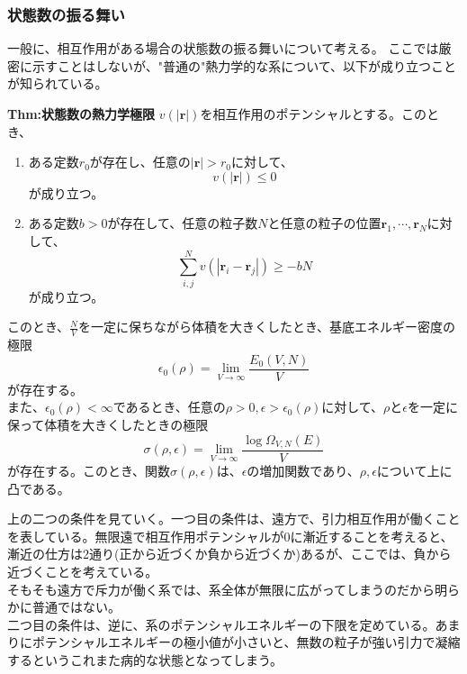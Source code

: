 \documentclass[a4paper,11pt]{jsarticle}
\numberwithin{equation}{section}
\begin{document}
\subsubsection{状態数の振る舞い}
一般に、相互作用がある場合の状態数の振る舞いについて考える。
ここでは厳密に示すことはしないが、"普通の"熱力学的な系について、以下が成り立つことが知られている。\\
\begin{itembox}[l]{\textbf{Thm:状態数の熱力学極限}}
  $v(|\bm{r}|)$を相互作用のポテンシャルとする。このとき、
  \begin{enumerate}
    \item ある定数$r_0$が存在し、任意の$|\bm{r}|>r_0$に対して、
    \begin{equation}
    v(|\bm{r}|) \leq 0
    \end{equation}
    が成り立つ。
    \item ある定数$b>0$が存在して、任意の粒子数$N$と任意の粒子の位置$\bm{r}_1, \cdots , \bm{r}_N$に対して、
    \begin{equation}
    \sum_{i,j}^{N} v(|\bm{r}_i - \bm{r}_j|) \geq -bN
    \end{equation}
    が成り立つ。
  \end{enumerate}
  このとき、$\frac{N}{V}$を一定に保ちながら体積を大きくしたとき、基底エネルギー密度の極限
  \begin{equation}
    \epsilon_0(\rho) = \lim_{V \rightarrow \infty} \frac{E_0(V,N)}{V}
  \end{equation}
  が存在する。\\
  また、$\epsilon_0(\rho)<\infty$であるとき、任意の$\rho >0, \epsilon > \epsilon_0(\rho)$に対して、$\rho$と$\epsilon$を一定に保って体積を大きくしたときの極限
  \begin{equation}
    \sigma (\rho, \epsilon) = \lim_{V \rightarrow \infty} \frac{\log \Omega_{V,N}(E)}{V}
  \end{equation}
  が存在する。このとき、関数$\sigma(\rho, \epsilon)$は、$\epsilon$の増加関数であり、$\rho,\epsilon$について上に凸である。
\end{itembox}
上の二つの条件を見ていく。一つ目の条件は、遠方で、引力相互作用が働くことを表している。無限遠で相互作用ポテンシャルが$0$に漸近することを考えると、漸近の仕方は2通り(正から近づくか負から近づくか)あるが、ここでは、負から近づくことを考えている。\\
そもそも遠方で斥力が働く系では、系全体が無限に広がってしまうのだから明らかに普通ではない。\\
二つ目の条件は、逆に、系のポテンシャルエネルギーの下限を定めている。あまりにポテンシャルエネルギーの極小値が小さいと、無数の粒子が強い引力で凝縮するというこれまた病的な状態となってしまう。\\
\end{document}
